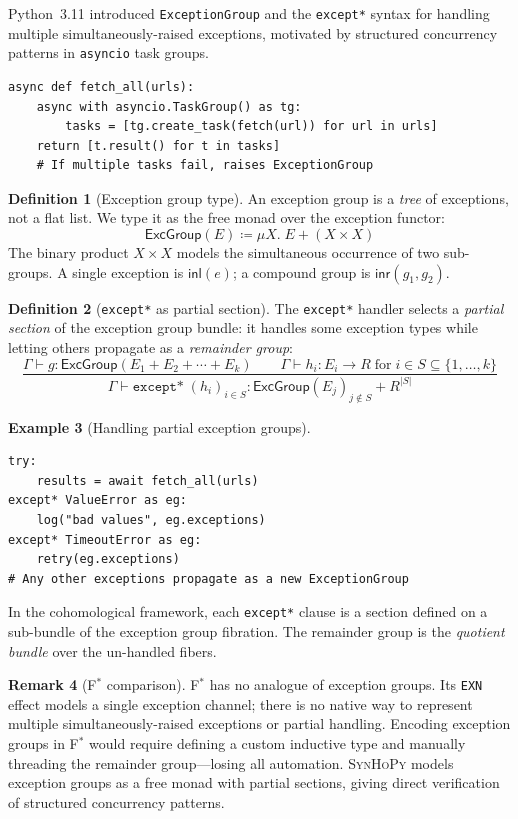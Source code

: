 \documentclass[11pt,a4paper]{report}
\theoremstyle{definition}
\newtheorem{definition}{Definition}[chapter]
\newtheorem{example}[definition]{Example}
\newtheorem{remark}[definition]{Remark}
\theoremstyle{plain}
\newcommand{\defeq}{\coloneqq}
\newcommand{\fstar}{F$^{*}$}
\newcommand{\synhopy}{\textsc{SynHoPy}}
\begin{document}
Python~3.11 introduced \texttt{ExceptionGroup} and the \texttt{except*} syntax
for handling multiple simultaneously-raised exceptions, motivated by structured
concurrency patterns in \texttt{asyncio} task groups.

\begin{lstlisting}[style=python]
async def fetch_all(urls):
    async with asyncio.TaskGroup() as tg:
        tasks = [tg.create_task(fetch(url)) for url in urls]
    return [t.result() for t in tasks]
    # If multiple tasks fail, raises ExceptionGroup
\end{lstlisting}

\begin{definition}[Exception group type]
An exception group is a \emph{tree} of exceptions, not a flat list.
We type it as the free monad over the exception functor:
\[
  \mathsf{ExcGroup}(E) \defeq \mu X.\; E + (X \times X)
\]
The binary product $X \times X$ models the simultaneous occurrence of two
sub-groups.  A single exception is $\mathsf{inl}(e)$; a compound group is
$\mathsf{inr}(g_1, g_2)$.
\end{definition}

\begin{definition}[\texttt{except*} as partial section]
The \texttt{except*} handler selects a \emph{partial section} of the exception
group bundle: it handles some exception types while letting others propagate
as a \emph{remainder group}:
\[
  \frac{
    \Gamma \vdash g : \mathsf{ExcGroup}(E_1 + E_2 + \cdots + E_k) \qquad
    \Gamma \vdash h_i : E_i \to R \;\text{for}\; i \in S \subseteq \{1,\ldots,k\}
  }{
    \Gamma \vdash \texttt{except*}\;(h_i)_{i \in S} :
      \mathsf{ExcGroup}(E_j)_{j \notin S} + R^{|S|}
  }
\]
\end{definition}

\begin{example}[Handling partial exception groups]
\begin{lstlisting}[style=python]
try:
    results = await fetch_all(urls)
except* ValueError as eg:
    log("bad values", eg.exceptions)
except* TimeoutError as eg:
    retry(eg.exceptions)
# Any other exceptions propagate as a new ExceptionGroup
\end{lstlisting}
In the cohomological framework, each \texttt{except*} clause is a
section defined on a sub-bundle of the exception group fibration.
The remainder group is the \emph{quotient bundle} over the un-handled fibers.
\end{example}

\begin{remark}[\fstar{} comparison]
\fstar{} has no analogue of exception groups.  Its \lstinline[style=fstar]|EXN|
effect models a single exception channel; there is no native way to represent
multiple simultaneously-raised exceptions or partial handling.
Encoding exception groups in \fstar{} would require defining a custom inductive
type and manually threading the remainder group---losing all automation.
\synhopy{} models exception groups as a free monad with partial sections,
giving direct verification of structured concurrency patterns.
\end{remark}
\end{document}
